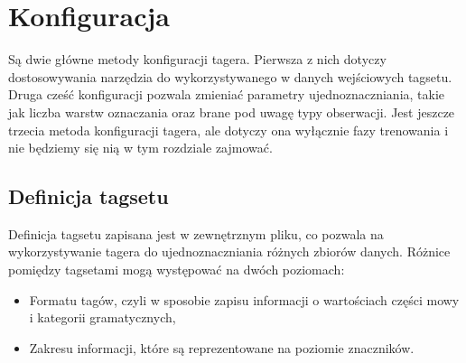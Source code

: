 \documentclass[a4paper,10]{article}
\begin{document}

\section{Konfiguracja}\label{sec:conf}

Są dwie główne metody konfiguracji tagera.
Pierwsza z nich dotyczy dostosowywania narzędzia do wykorzystywanego
w danych wejściowych tagsetu.
Druga cześć konfiguracji pozwala zmieniać parametry
ujednoznaczniania, takie jak liczba warstw oznaczania
oraz brane pod uwagę typy obserwacji.
Jest jeszcze trzecia metoda konfiguracji tagera, ale
dotyczy ona wyłącznie fazy trenowania i nie będziemy
się nią w tym rozdziale zajmować.

\subsection{Definicja tagsetu}\label{sec:tag_def}

Definicja tagsetu zapisana jest w zewnętrznym pliku, co
pozwala na wykorzystywanie tagera do ujednoznaczniania różnych zbiorów danych.
Różnice pomiędzy tagsetami mogą występować na dwóch poziomach:
\begin{itemize}
\item Formatu tagów, czyli w sposobie zapisu informacji o wartościach
  części mowy i kategorii gramatycznych,
\item Zakresu informacji, które są reprezentowane na poziomie znaczników.
\end{itemize}
\end{document}
